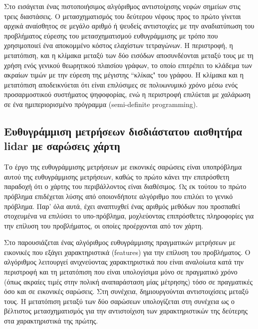 Στο \cite{Yang2021} εισάγεται ένας πιστοποιήσιμος αλγόριθμος αντιστοίχισης
νεφών σημείων στις τρεις διαστάσεις. Ο μετασχηματισμός του δεύτερου νέφους προς
το πρώτο γίνεται αρχικά αναίσθητος σε μεγάλο αριθμό ή ψευδείς αντιστοιχίες με
την αναδιατύπωση του προβλήματος εύρεσης του μετασχηματισμού ευθυγράμμισης με
τρόπο που χρησιμοποιεί ένα αποκομμένο κόστος ελαχίστων τετραγώνων. Η
περιστροφή, η μετατόπιση, και η κλίμακα μεταξύ των δύο εισόδων αποσυνδέονται
μεταξύ τους με τη χρήση ενός γενικού θεωρητικού πλαισίου γράφων, το οποίο
επιτρέπει το κλάδεμα των ακραίων τιμών με την εύρεση της μέγιστης ``κλίκας" του
γράφου.  Η κλίμακα και η μετατόπιση αποδεικνύεται ότι είναι επιλύσιμες σε
πολυωνυμικό χρόνο μέσω ενός προσαρμοστικού συστήματος ψηφοφορίας, ενώ η
περιστροφή επιλύεται με χαλάρωση σε ένα ημιπεριορισμένο πρόγραμμα
(semi-definite programming).

\subsection{Ευθυγράμμιση μετρήσεων δισδιάστατου αισθητήρα lidar με σαρώσεις
χάρτη}

Το έργο της ευθυγράμμισης μετρήσεων με εικονικές σαρώσεις είναι υποπρόβλημα
αυτού της ευθυγράμμισης μετρήσεων, καθώς το πρώτο κάνει την επιπρόσθετη
παραδοχή ότι ο χάρτης του περιβάλλοντος είναι διαθέσιμος. Ως εκ τούτου το πρώτο
πρόβλημα επιδέχεται λύσης από οποιονδήποτε αλγόριθμο που επιλύει το γενικό
πρόβλημα. Παρ' όλα αυτά, έχει αναπτυχθεί ένας αριθμός μεθόδων που προσπαθεί
στοχευμένα να επιλύσει το υπο-πρόβλημα, μοχλεύοντας επιπρόσθετες πληροφορίες
για την επίλυση του προβλήματος, οι οποίες προέρχονται από τον χάρτη.


Στο \cite{Lingemann2005a} παρουσιάζεται ένας αλγόριθμος ευθυγράμμισης
πραγματικών μετρήσεων με εικονικές που εξάγει χαρακτηριστικά (features) για την
επίλυση του προβλήματος.  Ο αλγόριθμος λειτουργεί ανιχνεύοντας χαρακτηριστικά
που είναι αναλοίωτα κατά την περιστροφή και τη μετατόπιση που είναι υπολογίσιμα
μόνο σε πραγματικό χρόνο (όπως ακραίες τιμές στην πολική αναπαράσταση μίας
μέτρησης) τόσο σε πραγματικές όσο και σε εικονικές σαρώσεις. Στη συνέχεια,
δημιουργούνται αντιστοιχίσεις μεταξύ τους.  Η μετατόπιση μεταξύ των δύο
σαρώσεων υπολογίζεται στη συνέχεια ως ο βέλτιστος μετασχηματισμός για την
αντιστοίχιση των χαρακτηριστικών της δεύτερης στα χαρακτηριστικά της πρώτης.

